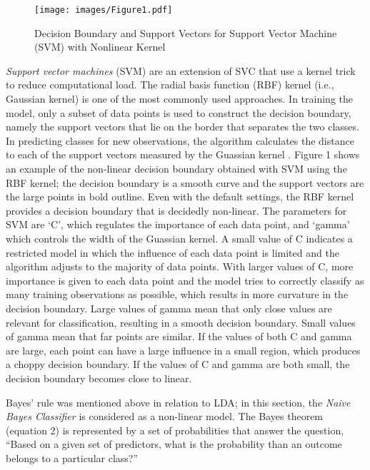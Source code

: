 \documentclass[sigconf]{acmart}
\begin{document}
\begin{figure}[!ht]
  \centering\texttt{[image: images/Figure1.pdf]}
  \caption{Decision Boundary and Support Vectors for Support Vector Machine 
  (SVM) with Nonlinear Kernel \cite{muller17}}
  \label{f:Figure1}
\end{figure}


\emph{Support vector machines} (SVM) are an extension of SVC that use a 
kernel trick to reduce computational load. The radial basis function (RBF) 
kernel (i.e., Gaussian kernel) is one of the most commonly used approaches. 
In training the model, only a subset of data points is used to construct the 
decision boundary, namely the support vectors that lie on the border that 
separates the two classes. In predicting classes for new observations, the 
algorithm calculates the distance to each of the support vectors measured 
by the Guassian kernel \cite{muller17}. Figure 1 shows an example of the 
non-linear decision boundary obtained with SVM using the RBF kernel; the 
decision boundary is a smooth curve and the support vectors are the large 
points in bold outline. Even with the default settings, the RBF kernel 
provides a decision boundary that is decidedly non-linear. The parameters 
for SVM are `C', which regulates the importance of each data point, and 
`gamma' which controls the width of the Guassian kernel. A small value of 
C indicates a restricted model in which the influence of each data point is 
limited and the algorithm adjusts to the majority of data points. With larger 
values of C, more importance is given to each data point and the model tries 
to correctly classify as many training observations as possible, which results 
in more curvature in the decision boundary. Large values of gamma mean that 
only close values are relevant for classification, resulting in a smooth 
decision boundary. Small values of gamma mean that far points are similar. 
If the values of both C and gamma are large, each point can have a large 
influence in a small region, which produces a choppy decision boundary. 
If the values of C and gamma are both small, the decision boundary becomes 
close to linear.


Bayes' rule was mentioned above in relation to LDA; in this section, the 
\emph{Naive Bayes Classifier} is considered as a non-linear model.
The Bayes theorem (equation 2) is represented by a set of probabilities 
that answer the question, ``Based on a given set of predictors, 
what is the probability than an outcome belongs to a particular class?''
\end{document}
